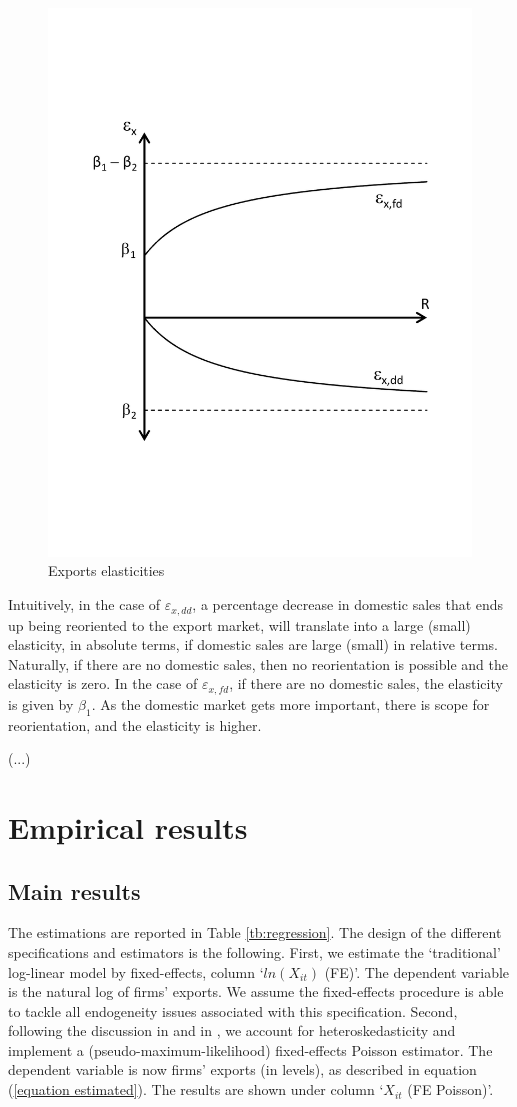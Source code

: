 \documentclass[a4paper,12pt]{article}
\begin{document}
\begin{figure}[!ht]
	\centering
	\includegraphics[trim={2cm 5cm 2cm 5cm},clip,width=0.5\linewidth]{figures/figure.pdf}
	\caption{Exports elasticities}
	\label{fig:elasticities}
\end{figure}


Intuitively, in the case of $\varepsilon_{x,dd}$, a percentage decrease in domestic sales that ends up being reoriented to the export market, will translate into a large (small) elasticity, in absolute terms, if domestic sales are large (small) in relative terms. Naturally, if there are no domestic sales, then no reorientation is possible and the elasticity is zero. In the case of $\varepsilon_{x,fd}$, if there are no domestic sales, the elasticity is given by $\beta_{1}$. As the domestic market gets more important, there is scope for reorientation, and the elasticity is higher.



\vspace{0.5cm}
(...)
\vspace{0.5cm}




\section{Empirical results}\label{sec:results}

\subsection{Main results}\label{sec:results:main}

The estimations are reported in Table \ref{tb:regression}. The design of the different specifications and estimators is the following. First, we estimate the `traditional' log-linear model by fixed-effects, column `$ln\left (X_{it} \right )$ (FE)'. The dependent variable is the natural log of firms' exports. We assume the fixed-effects procedure is able to tackle all endogeneity issues associated with this specification.
Second, following the discussion in \cite{silva2006log} and in \cite{egger2015panel}, we account for heteroskedasticity and implement a (pseudo-maximum-likelihood) fixed-effects Poisson estimator. The dependent variable is now firms' exports (in levels), as described in equation (\ref{equation estimated}). The results are shown under column `$X_{it}$ (FE Poisson)'.
\end{document}
